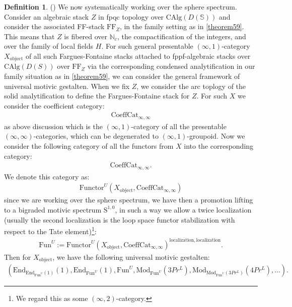 \documentclass[12pt]{article}
\theoremstyle{definition}
\newtheorem{definition}{Definition}
\begin{document}
\begin{definition}()
We now systematically working over the sphere spectrum. Consider an algebraic stack $Z$ in fpqc topology over $\mathrm{CAlg}(D(\mathbb{S}))$ and consider the associated FF-stack $\mathrm{FF}_Z$, in the family setting as in \cref{theorem59}. This means that $Z$ is fibered over $\mathbb{N}_c$, the compactification of the integers, and over the family of local fields $H$. For such general presentable $(\infty,1)$-category $X_\mathrm{object}$ of all such Fargues-Fontaine stacks attached to fppf-algebraic stacks over $\mathrm{CAlg}(D(S))$ over $\mathrm{FF}_Z$ via the corresponding condensed analytification in our family situation as in \cref{theorem59}, we can consider the general framework of universal motivic gestalten. When we fix $Z$, we consider the arc toplogy of the solid analytification to define the Fargues-Fontaine stack for $Z$. For such $X$ we consider the coefficient category:
\begin{align}
\mathrm{CoeffCat}_{\infty,\infty}
\end{align}
as above discussion which is the $(\infty,1)$-category of all the presentable $(\infty,\infty)$-categories, which can be degenerated to $(\infty,1)$-groupoid. Now we consider the following category of all the functors from $X$ into the corresponding category:
\begin{align}
\mathrm{CoeffCat}_{\infty,\infty}.
\end{align}
We denote this category as:
\begin{align}
\mathrm{Functor}^U(X_\mathrm{object},\mathrm{CoeffCat}_{\infty,\infty})
\end{align}
since we are working over the sphere spectrum, we have then a promotion lifting to a bigraded motivic spectrum $\mathrm{S}^{1,0}$, in such a way we allow a twice localization (usually the second localization is the loop space functor stabilization with respect to the Tate element)\footnote{We regard this as some $(\infty,2)$-category.}:
\begin{align}
\mathrm{Fun}^U:=\mathrm{Functor}^U(X_\mathrm{object},\mathrm{CoeffCat}_{\infty,\infty})^{\mathrm{localization}, \mathrm{localization}}.
\end{align}
Then for $X_\mathrm{object}$, we have the following universal motivic gestalten:
\begin{align}
(\mathrm{End}_{\mathrm{End}_{\mathrm{Fun}^U}(1)}(1),\mathrm{End}_{\mathrm{Fun}^U}(1),\mathrm{Fun}^U,\mathrm{Mod}_{\mathrm{Fun}^U}(3Pr^L),\mathrm{Mod}_{\mathrm{Mod}_{\mathrm{Fun}^U}(3Pr^L)}(4Pr^L),...).

\end{align}
\end{definition}
\end{document}
